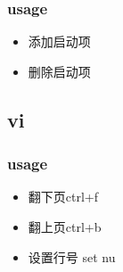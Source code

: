 \documentclass[a4paper,10pt,english]{sphinxmanual}
\begin{document}
\subsubsection{usage}
\label{\detokenize{linux/shell:id12}}\begin{itemize}
\item {} 
添加启动项

\begin{sphinxVerbatim}[commandchars=\\\{\}]
     
     
     
\end{sphinxVerbatim}

\item {} 
删除启动项

\begin{sphinxVerbatim}[commandchars=\\\{\}]
    
    
    
\end{sphinxVerbatim}

\end{itemize}


\subsection{vi}
\label{\detokenize{linux/shell:vi}}

\subsubsection{usage}
\label{\detokenize{linux/shell:id13}}\begin{itemize}
\item {} 
翻下页ctrl+f

\item {} 
翻上页ctrl+b

\item {} 
设置行号 set nu

\end{itemize}
\end{document}
